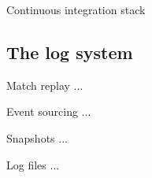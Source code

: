 \documentclass{beamer}
\begin{document}
\begin{frame}{Continuous integration stack}
\begin{center}
\noindent{}
\end{center}
\end{frame}
\subsection{The log system}
\begin{frame}{Match replay}
...
\end{frame}
\begin{frame}{Event sourcing}
...
\end{frame}
\begin{frame}{Snapshots}
...
\end{frame}
\begin{frame}{Log files}
...
\end{frame}
\end{document}
